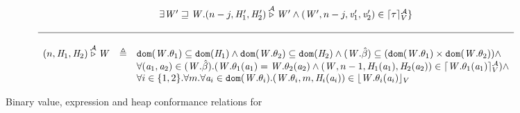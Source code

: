 \begin{figure*}[!htbp]
\begin{displaymath}
\begin{array}{lll}
                   &   & ~~~~~~~\exists \mathit{W}' \sqsupseteq \mathit{W}. (n - j, \mathit{H}_1', \mathit{H}_2') \overset{\mathcal{A}}\triangleright \mathit{W}' \wedge
                         (\mathit{W}', n - j, \mathit{v}_1', \mathit{v}_2') \in \lceil \tau \rceil_{V}^{\mathcal{A}} \}
    \\ \\
    \hline \\
    (n, \mathit{H}_1, \mathit{H}_2) \overset{\mathcal{A}}\triangleright \mathit{W} & \triangleq & \mathtt{dom}(\mathit{W}.\theta_1) \subseteq \mathtt{dom}(\mathit{H}_1) \wedge
                                                                   \mathtt{dom}(\mathit{W}.\theta_2) \subseteq \mathtt{dom}(\mathit{H}_2) \wedge
                                                     (\mathit{W}.\hat{\beta}) \subseteq (\mathtt{dom}(\mathit{W}.\theta_1) \times \mathtt{dom}(\mathit{W}.\theta_2))
                                                           \wedge \\
                                                    &    & \forall (\mathit{a}_1,\mathit{a}_2) \in (\mathit{W}.\hat{\beta}).
                                                           (\mathit{W}.\theta_1(\mathit{a}_1) = \mathit{W}.\theta_2(\mathit{a}_2) \wedge
                                                     (\mathit{W}, n-1, \mathit{H}_1(\mathit{a}_1),\mathit{H}_2(\mathit{a}_2)) \in
                                                           \lceil \mathit{W}.\theta_1(\mathit{a}_1) \rceil_{V}^{\mathcal{A}})
                                                           \wedge \\
                                                    &   & \forall i \in \{1,2\}. \forall m. \forall \mathit{a}_i \in \mathtt{dom}(\mathit{W}.\theta_i).
                                                          (\mathit{W}.\theta_i, m, \mathit{H}_i(\mathit{a}_i)) \in \lfloor \mathit{W}.\theta_i(\mathit{a}_i) \rfloor_{V}
  \end{array}
\end{displaymath}

\caption{Binary value, expression and heap conformance relations for {\fg}}
\label{fig:blr-fg}
\end{figure*}

